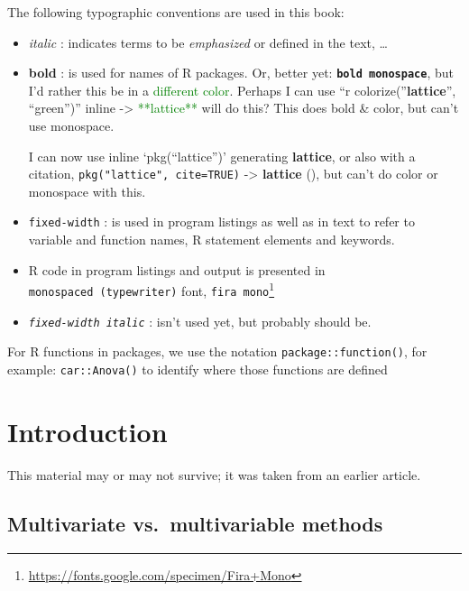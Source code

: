 \documentclass[
  letterpaper,
  10pt,
  krantz2]{krantz}
\providecommand{\href}[2]{#2\footnote{\url{#1}}}
\begin{document}

The following typographic conventions are used in this book:

\begin{itemize}
\item
  \emph{italic} : indicates terms to be \emph{emphasized} or defined in
  the text, \ldots{}
\item
  \textbf{bold} : is used for names of R packages. Or, better yet:
  \textbf{\texttt{bold\ monospace}}, but I'd rather this be in a
  \textcolor{green}{different color}. Perhaps I can use ``r
  colorize(''\textbf{lattice}'', ``green'')'' inline -\textgreater{}
  \textcolor{green}{**lattice**} will do this? This does bold \&
  color, but can't use monospace.

  I can now use inline `pkg(``lattice'')' generating \textbf{lattice},
  or also with a citation, \texttt{pkg("lattice",\ cite=TRUE)}
  -\textgreater{} \textbf{lattice} (), but can't do color or monospace with this.
\item
  \texttt{fixed-width} : is used in program listings as well as in text
  to refer to variable and function names, R statement elements and
  keywords.
\item
  R code in program listings and output is presented in
  \texttt{monospaced\ (typewriter)} font,
  \href{https://fonts.google.com/specimen/Fira+Mono}{\texttt{fira\ mono}}
\item
  \emph{\texttt{fixed-width\ italic}} : isn't used yet, but probably
  should be.
\end{itemize}

For R functions in packages, we use the notation
\texttt{package::function()}, for example: \texttt{car::Anova()} to
identify where those functions are defined

\mainmatter


\chapter{Introduction}\label{sec-introduction}

This material may or may not survive; it was taken from an earlier
article.

\section{Multivariate vs.~multivariable
methods}\label{multivariate-vs.-multivariable-methods}
\end{document}
